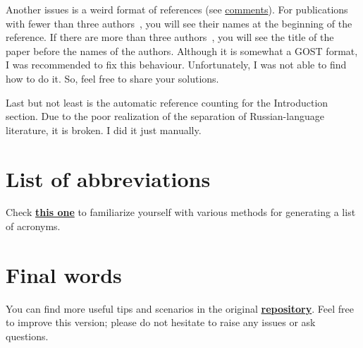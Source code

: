Another issues is a weird format of references (see \href{https://github.com/aleksey-uvarov/Russian-English-PhD-LateX/blob/master/Readme/Bibliography.md}{comments}). For publications with fewer than three authors~\cite{lorden1971procedures}, you will see their names at the beginning of the reference. If there are more than three authors~\cite{zhang2024self}, you will see the title of the paper before the names of the authors. 
Although it is somewhat a GOST format, I was recommended to fix this behaviour. Unfortunately, I was not able to find how to do it. So, feel free to share your solutions. 

Last but not least is the automatic reference counting for the Introduction section. Due to the poor realization of the separation of Russian-language literature, it is broken. I did it just manually. 

\section{List of abbreviations}
Check \href{https://github.com/AndreyAkinshin/Russian-Phd-LaTeX-Dissertation-Template/blob/33420d8817f8cb0e3c1d2610a9c996212e2f80bb/Dissertation/part1.tex#L540}{\textbf{this one}} to familiarize yourself with various methods for generating a list of acronyms. 
 
\section{Final words}
You can find more useful tips and scenarios in the original \href{https://github.com/aleksey-uvarov/Russian-English-PhD-LateX/}{\textbf{repository}}. Feel free to improve this version; please do not hesitate to raise any issues or ask questions. 

